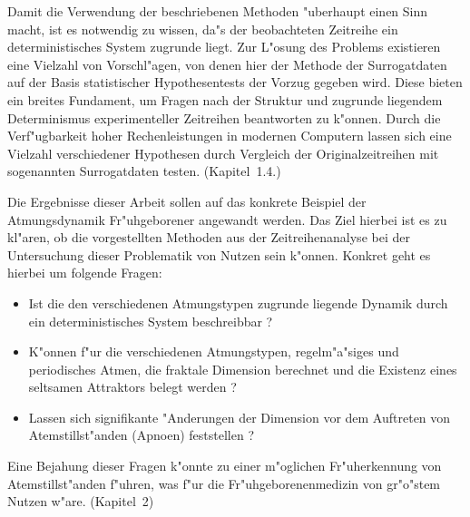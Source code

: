Damit die Verwendung der beschriebenen Methoden "uberhaupt einen Sinn macht, ist es
notwendig zu wissen, da"s der beobachteten Zeitreihe ein deterministisches System zugrunde
liegt.  Zur L"osung des Problems existieren eine Vielzahl von Vorschl"agen, von denen hier
der Methode der Surrogatdaten auf der Basis statistischer Hypothesentests der Vorzug gegeben
wird.  Diese bieten ein breites Fundament, um Fragen nach der Struktur und
zugrunde liegendem Determinismus experimenteller Zeitreihen beantworten zu k"onnen. Durch
die Verf"ugbarkeit hoher Rechenleistungen in modernen Computern lassen sich eine Vielzahl
verschiedener Hypothesen durch Vergleich der Originalzeitreihen mit sogenannten
Surrogatdaten testen. (Kapitel~1.4.)

Die Ergebnisse dieser Arbeit sollen auf das konkrete Beispiel der Atmungsdynamik
Fr"uhgeborener angewandt werden. Das Ziel
hierbei ist es zu kl"aren, ob die vorgestellten Methoden aus der Zeitreihenanalyse bei der
Untersuchung dieser Problematik von Nutzen sein k"onnen.
Konkret geht es hierbei um folgende Fragen:
\begin{itemize}
\item Ist die den verschiedenen Atmungstypen zugrunde liegende Dynamik durch ein
  deterministisches System beschreibbar ?
\item K"onnen f"ur die verschiedenen Atmungstypen, regelm"a"siges und periodisches Atmen, die
  fraktale Dimension berechnet und  die Existenz eines seltsamen Attraktors belegt werden ?
\item Lassen sich signifikante "Anderungen der Dimension vor dem Auftreten von
  Atemstillst"an\-den (Apnoen) feststellen ?
\end{itemize}
Eine Bejahung dieser Fragen k"onnte zu einer m"oglichen Fr"uherkennung von
Atemstillst"anden f"uhren, was f"ur die Fr"uhgeborenenmedizin von gr"o"stem Nutzen w"are.
(Kapitel~2)





